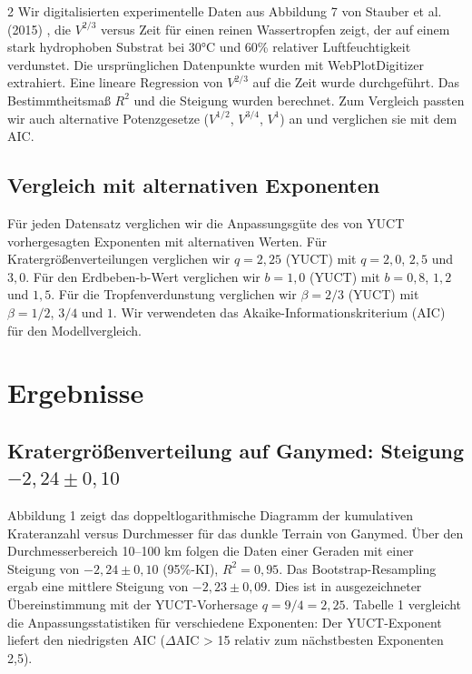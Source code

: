 \documentclass[11pt,a4paper]{article}
\begin{document}
\begin{multicols}{2}
		Wir digitalisierten experimentelle Daten aus Abbildung 7 von Stauber et al. (2015) \cite{Stauber2015}, die \(V^{2/3}\) versus Zeit für einen reinen Wassertropfen zeigt, der auf einem stark hydrophoben Substrat bei 30°C und 60\% relativer Luftfeuchtigkeit verdunstet. Die ursprünglichen Datenpunkte wurden mit WebPlotDigitizer \cite{WebPlotDigitizer} extrahiert. Eine lineare Regression von \(V^{2/3}\) auf die Zeit wurde durchgeführt. Das Bestimmtheitsmaß \(R^2\) und die Steigung wurden berechnet. Zum Vergleich passten wir auch alternative Potenzgesetze (\(V^{1/2}\), \(V^{3/4}\), \(V^{1}\)) an und verglichen sie mit dem AIC.
		
		\subsection{Vergleich mit alternativen Exponenten}
		
		Für jeden Datensatz verglichen wir die Anpassungsgüte des von YUCT vorhergesagten Exponenten mit alternativen Werten. Für Kratergrößenverteilungen verglichen wir \(q = 2,25\) (YUCT) mit \(q = 2,0\), \(2,5\) und \(3,0\). Für den Erdbeben-b-Wert verglichen wir \(b = 1,0\) (YUCT) mit \(b = 0,8\), \(1,2\) und \(1,5\). Für die Tropfenverdunstung verglichen wir \(\beta = 2/3\) (YUCT) mit \(\beta = 1/2\), \(3/4\) und \(1\). Wir verwendeten das Akaike-Informationskriterium (AIC) für den Modellvergleich.
		
		\section{Ergebnisse}
		
		\subsection{Kratergrößenverteilung auf Ganymed: Steigung \(-2,24 \pm 0,10\)}
		
		Abbildung 1 zeigt das doppeltlogarithmische Diagramm der kumulativen Krateranzahl versus Durchmesser für das dunkle Terrain von Ganymed. Über den Durchmesserbereich 10–100 km folgen die Daten einer Geraden mit einer Steigung von \(-2,24 \pm 0,10\) (95\%-KI), \(R^2 = 0,95\). Das Bootstrap-Resampling ergab eine mittlere Steigung von \(-2,23 \pm 0,09\). Dies ist in ausgezeichneter Übereinstimmung mit der YUCT-Vorhersage \(q = 9/4 = 2,25\). Tabelle 1 vergleicht die Anpassungsstatistiken für verschiedene Exponenten: Der YUCT-Exponent liefert den niedrigsten AIC (\(\Delta\)AIC > 15 relativ zum nächstbesten Exponenten 2,5).
		

\end{multicols}
\end{document}
